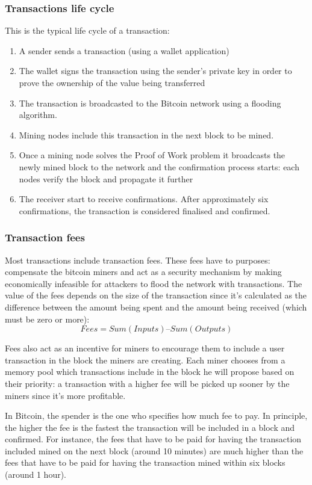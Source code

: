 \subsubsection{Transactions life cycle}
This is the typical life cycle of a transaction:
\begin{enumerate}
  \item A sender sends a transaction (using a wallet application)
  \item The wallet signs the transaction using the sender's private key in order
  to prove the ownership of the value being transferred
  \item The transaction is broadcasted to the Bitcoin network using a flooding algorithm.
  \item Mining nodes include this transaction in the next block to be mined.
  \item Once a mining node solves the Proof of Work problem it broadcasts the
  newly mined block to the network and the confirmation process starts: each
  nodes verify the block and propagate it further
  \item The receiver start to receive confirmations. After approximately six
  confirmations, the transaction is considered finalised and confirmed.
\end{enumerate}




\subsubsection{Transaction fees} Most transactions include transaction fees.
These fees have to purposes: compensate the bitcoin miners and act as a security
mechanism by making economically infeasible for attackers to flood the network
with transactions. The value of the fees depends on the size of the
transaction since it's calculated as the difference between the amount being spent and the amount being received (which must be zero or more): \[Fees = Sum(Inputs) – Sum(Outputs)\]

Fees also act as an incentive for miners to encourage them to include a user transaction in the block the miners are creating. Each miner chooses from a memory pool which transactions include in the block he will propose based on their priority: a transaction with a higher fee will be picked up sooner by the miners since it's more profitable.

In Bitcoin, the spender is the one who specifies how much fee to pay. In principle, the higher the fee is the fastest the transaction will be included in a block and confirmed. For instance, the fees that have to be paid for having the transaction included mined on the next block (around 10 minutes) are much higher than the fees that have to be paid for having the transaction mined within six blocks (around 1 hour).  

